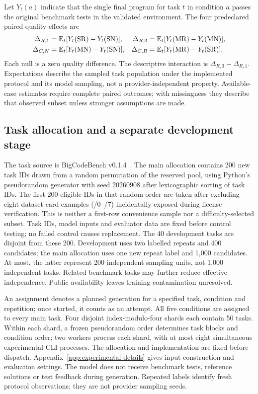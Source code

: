 Let $Y_t(a)$ indicate that the single final program for task $t$ in condition $a$ passes the original benchmark tests in the validated environment. The four predeclared paired quality effects are
\begin{align}
\Delta_{R,1}&=\mathbb{E}_t[Y_t(\mathrm{SR})-Y_t(\mathrm{SN})], &
\Delta_{R,3}&=\mathbb{E}_t[Y_t(\mathrm{MR})-Y_t(\mathrm{MN})],\\
\Delta_{C,N}&=\mathbb{E}_t[Y_t(\mathrm{MN})-Y_t(\mathrm{SN})], &
\Delta_{C,R}&=\mathbb{E}_t[Y_t(\mathrm{MR})-Y_t(\mathrm{SR})].
\end{align}
Each null is a zero quality difference. The descriptive interaction is $\Delta_{R,3}-\Delta_{R,1}$. Expectations describe the sampled task population under the implemented protocol and its model sampling, not a provider-independent property. Available-case estimates require complete paired outcomes; with missingness they describe that observed subset unless stronger assumptions are made.

\subsection{Task allocation and a separate development stage}
The task source is BigCodeBench v0.1.4~\cite{zhuo2024bigcodebench}. The main allocation contains 200 new task IDs drawn from a random permutation of the reserved pool, using Python's pseudorandom generator with seed 20260908 after lexicographic sorting of task IDs. The first 200 eligible IDs in that random order are taken after excluding eight dataset-card examples (/0--/7) incidentally exposed during license verification. This is neither a first-row convenience sample nor a difficulty-selected subset. Task IDs, model inputs and evaluator data are fixed before control testing; no failed control causes replacement. The 40 development tasks are disjoint from these 200. Development uses two labelled repeats and 400 candidates; the main allocation uses one new repeat label and 1,000 candidates. At most, the latter represent 200 independent sampling units, not 1,000 independent tasks. Related benchmark tasks may further reduce effective independence. Public availability leaves training contamination unresolved.

An assignment denotes a planned generation for a specified task, condition and repetition; once started, it counts as an attempt. All five conditions are assigned to every main task. Four disjoint index-modulo-four shards each contain 50 tasks. Within each shard, a frozen pseudorandom order determines task blocks and condition order; two workers process each shard, with at most eight simultaneous experimental CLI processes. The allocation and implementation are fixed before dispatch. Appendix~\ref{app:experimental-details} gives input construction and evaluation settings. The model does not receive benchmark tests, reference solutions or test feedback during generation. Repeated labels identify fresh protocol observations; they are not provider sampling seeds.

